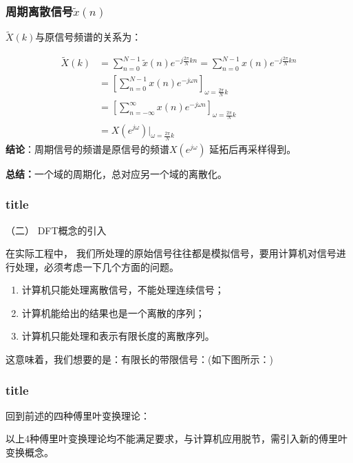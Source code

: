 \documentclass[notheorems,compress,mathserif,table]{beamer}
\begin{document}
\begin{frame}[shrink]\frametitle{周期离散信号$\tilde{x}(n)$}%
        $\tilde{X}(k)$与原信号频谱的关系为：

        \begin{equation}
        \begin{split}
        \tilde{X}(k) &= \sum_{n=0}^{N-1}\tilde{x}(n)e^{-j\frac{2\pi}{N}kn}= \sum_{n=0}^{N-1}x(n)e^{-j\frac{2\pi}{N}kn}\\
                     &= \left[\sum_{n=0}^{N-1}x(n)e^{-j\omega n}\right]_{\omega =\frac{2\pi}{N}k}\\
                     &= \left[\sum_{n=-\infty}^{\infty}x(n)e^{-j\omega n}\right]_{\omega =\frac{2\pi}{N}k}\\
                     &= X(e^{j\omega})\Big|_{\omega =\frac{2\pi}{N}k}
        \end{split}
        \end{equation}
        \textbf{结论}：周期信号的频谱是原信号的频谱$X(e^{j\omega})$ 延拓后再采样得到。


\textbf{总结：}一个域的周期化，总对应另一个域的离散化。
\end{frame}
%




\begin{frame}[shrink]\frametitle{title}%
（二） DFT概念的引入
  \par 在实际工程中， 我们所处理的原始信号往往都是模拟信号，要用计算机对信号进行处理，必须考虑一下几个方面的问题。
  \begin{enumerate}
    \item 计算机只能处理离散信号，不能处理连续信号；
    \item 计算机能给出的结果也是一个离散的序列；
    \item 计算机只能处理和表示有限长度的离散序列。
  \end{enumerate}
  这意味着，我们想要的是：有限长的带限信号：(如下图所示：)
  \newline\newline\newline\newline\newline

\end{frame}


\begin{frame}[shrink]\frametitle{title}%


  \par 回到前述的四种傅里叶变换理论：
  \newline\newline\newline\newline\newline\newline\newline\newline

  以上4种傅里叶变换理论均不能满足要求，与计算机应用脱节，需引入新的傅里叶变换概念。
\end{frame}
\end{document}
